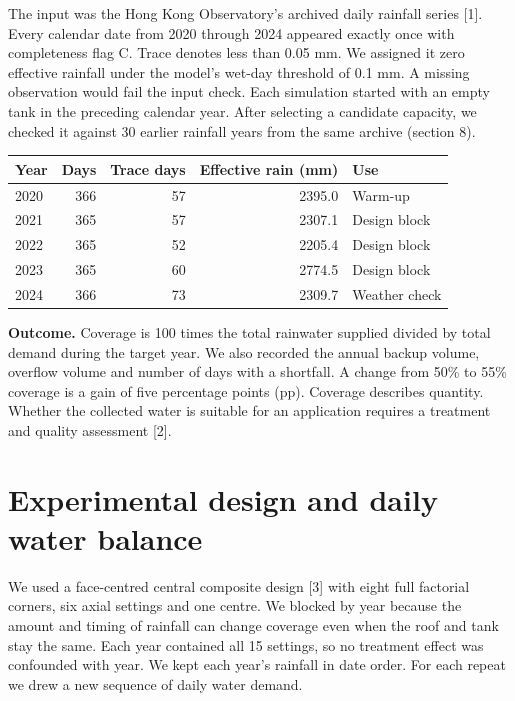 \documentclass[11pt,a4paper]{article}
\newcommand{\topic}[1]{\section*{\sffamily #1}}
\begin{document}
The input was the Hong Kong Observatory's archived daily rainfall series [1]. Every calendar date from 2020 through 2024 appeared exactly once with completeness flag C. Trace denotes less than 0.05 mm. We assigned it zero effective rainfall under the model's wet-day threshold of 0.1 mm. A missing observation would fail the input check. Each simulation started with an empty tank in the preceding calendar year. After selecting a candidate capacity, we checked it against 30 earlier rainfall years from the same archive (section 8).
\begin{center}\begin{tabular}{lrrrl}\toprule
Year & Days & Trace days & Effective rain (mm) & Use\\\midrule
2020&366&57&2395.0&Warm-up\\
2021&365&57&2307.1&Design block\\
2022&365&52&2205.4&Design block\\
2023&365&60&2774.5&Design block\\
2024&366&73&2309.7&Weather check\\\bottomrule
\end{tabular}\end{center}
\textbf{Outcome.} Coverage is 100 times the total rainwater supplied divided by total demand during the target year. We also recorded the annual backup volume, overflow volume and number of days with a shortfall. A change from 50\% to 55\% coverage is a gain of five percentage points (pp). Coverage describes quantity. Whether the collected water is suitable for an application requires a treatment and quality assessment [2].
\newpage
\topic{2 \quad Experimental design and daily water balance}
We used a face-centred central composite design [3] with eight full factorial corners, six axial settings and one centre. We blocked by year because the amount and timing of rainfall can change coverage even when the roof and tank stay the same. Each year contained all 15 settings, so no treatment effect was confounded with year. We kept each year's rainfall in date order. For each repeat we drew a new sequence of daily water demand.
\end{document}
